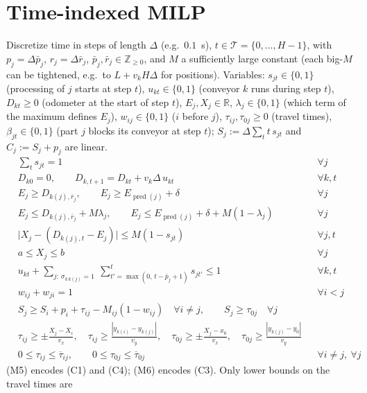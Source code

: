 \documentclass[11pt,a4paper]{article}
\theoremstyle{plain}
\theoremstyle{definition}
\theoremstyle{remark}
\newcommand{\pred}{\operatorname{pred}}
\newcommand{\R}{\mathbb{R}}
\begin{document}
\section{Time-indexed MILP}\label{app:milp}
Discretize time in steps of length $\Delta$ (e.g.\ $0.1$~s), $t\in\mathcal T=\{0,\dots,H-1\}$,
with $p_j=\Delta\bar p_j$, $r_j=\Delta\bar r_j$, $\bar p_j,\bar r_j\in\mathbb Z_{\ge0}$, and
$M$ a sufficiently large constant (each big-$M$ can be tightened, e.g.\ to $L+v_kH\Delta$
for positions). Variables: $s_{jt}\in\{0,1\}$ (processing of $j$ starts at step $t$),
$u_{kt}\in\{0,1\}$ (conveyor $k$ runs during step $t$), $D_{kt}\ge0$ (odometer at the start
of step $t$), $E_j,X_j\in\R$, $\lambda_j\in\{0,1\}$ (which term of the maximum defines
$E_j$), $w_{ij}\in\{0,1\}$ ($i$ before $j$), $\tau_{ij},\tau_{0j}\ge0$ (travel times),
$\beta_{jt}\in\{0,1\}$ (part $j$ blocks its conveyor at step $t$); $S_j:=\Delta\sum_tt\,s_{jt}$
and $C_j:=S_j+p_j$ are linear.
\begin{align}
&\textstyle\sum_{t}s_{jt}=1 && \forall j \tag{M1}\\
&D_{k0}=0,\qquad D_{k,t+1}=D_{kt}+v_k\Delta\,u_{kt} && \forall k,t \tag{M2}\\
&E_j\ge D_{k(j),\bar r_j},\qquad E_j\ge E_{\pred(j)}+\delta && \forall j \tag{M3a}\\
&E_j\le D_{k(j),\bar r_j}+M\lambda_j,\qquad E_j\le E_{\pred(j)}+\delta+M(1-\lambda_j) && \forall j \tag{M3b}\\
&\bigl|X_j-(D_{k(j),t}-E_j)\bigr|\le M(1-s_{jt}) && \forall j,t \tag{M4}\\
&a\le X_j\le b && \forall j \tag{M5}\\
&u_{kt}+\sum_{j:\ \sigma_{k\,k(j)}=1}\ \sum_{t'=\max(0,\,t-\bar p_j+1)}^{t}s_{jt'}\le 1 && \forall k,t \tag{M6}\\
&w_{ij}+w_{ji}=1 && \forall i<j \tag{M7}\\
&S_j\ge S_i+p_i+\tau_{ij}-M_{ij}(1-w_{ij})\quad\forall i\neq j,\qquad S_j\ge\tau_{0j}\quad\forall j \tag{M8}\\
&\tau_{ij}\ge\pm\frac{X_j-X_i}{v_x},\quad \tau_{ij}\ge\frac{|y_{k(i)}-y_{k(j)}|}{v_y},\quad
 \tau_{0j}\ge\pm\frac{X_j-x_0}{v_x},\quad \tau_{0j}\ge\frac{|y_{k(j)}-y_0|}{v_y} \tag{M9}\\
&0\le\tau_{ij}\le\overline\tau_{ij},\qquad 0\le\tau_{0j}\le\overline\tau_{0j} && \forall i\neq j,\ \forall j \tag{M9b}
\end{align}
(M5) encodes (C1) and (C4); (M6) encodes (C3). Only lower bounds on the travel times are
\end{document}
